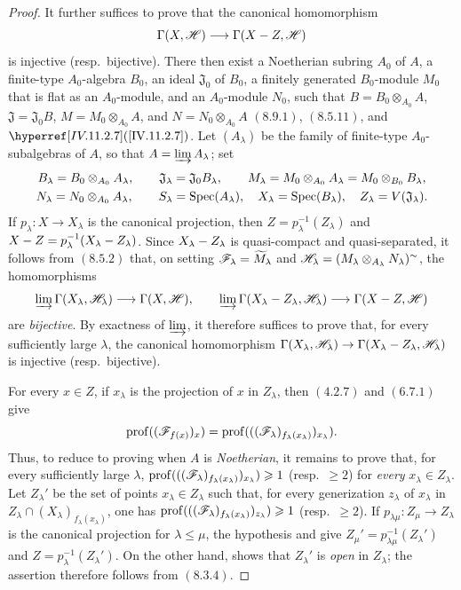 \begin{proof}
It further suffices to prove that the canonical homomorphism
\[
  \Gamma(X,\mathscr{H})\longrightarrow\Gamma(X-Z,\mathscr{H})
\]
is injective (resp.\ bijective). There then exist a Noetherian subring $A_0$ of $A$, a finite-type $A_0$-algebra $B_0$, an ideal $\mathfrak{J}_0$ of $B_0$, a finitely generated $B_0$-module $M_0$ that is flat as an $A_0$-module, and an $A_0$-module $N_0$, such that
$B=B_0\otimes_{A_0}A$, $\mathfrak{J}=\mathfrak{J}_0B$, $M=M_0\otimes_{A_0}A$, and $N=N_0\otimes_{A_0}A$ $(8.9.1)$, $(8.5.11)$, and $\sref{IV.11.2.7}$. Let $(A_\lambda)$ be the family of finite-type $A_0$-subalgebras of $A$, so that $A=\varinjlim A_\lambda$; set
\[
\begin{gathered}
  B_\lambda=B_0\otimes_{A_0}A_\lambda,\qquad
  \mathfrak{J}_\lambda=\mathfrak{J}_0B_\lambda,\qquad
  M_\lambda=M_0\otimes_{A_0}A_\lambda=M_0\otimes_{B_0}B_\lambda,\\
  N_\lambda=N_0\otimes_{A_0}A_\lambda,\qquad
  S_\lambda=\operatorname{Spec}(A_\lambda),\quad X_\lambda=\operatorname{Spec}(B_\lambda),\quad
  Z_\lambda=V(\mathfrak{J}_\lambda).
\end{gathered}
\]
If $p_\lambda:X\to X_\lambda$ is the canonical projection, then $Z=p_\lambda^{-1}(Z_\lambda)$ and $X- Z=p_\lambda^{-1}(X_\lambda- Z_\lambda)$. Since $X_\lambda- Z_\lambda$ is quasi-compact and quasi-separated, it follows from $(8.5.2)$ that, on setting $\mathscr{F}_\lambda=\widetilde{M}_\lambda$ and $\mathscr{H}_\lambda=(M_\lambda\otimes_{A_\lambda}N_\lambda)^\sim$, the homomorphisms
\[
  \varinjlim\Gamma(X_\lambda,\mathscr{H}_\lambda)\longrightarrow\Gamma(X,\mathscr{H}),
  \qquad
  \varinjlim\Gamma(X_\lambda-Z_\lambda,\mathscr{H}_\lambda)\longrightarrow\Gamma(X-Z,\mathscr{H})
\]
are \emph{bijective}. By exactness of $\varinjlim$, it therefore suffices to prove that, for every sufficiently large $\lambda$, the canonical homomorphism $\Gamma(X_\lambda,\mathscr{H}_\lambda)\to\Gamma(X_\lambda-Z_\lambda,\mathscr{H}_\lambda)$ is injective (resp.\ bijective).

For every $x\in Z$, if $x_\lambda$ is the projection of $x$ in $Z_\lambda$, then $(4.2.7)$ and $(6.7.1)$ give
\[
  \operatorname{prof}((\mathscr{F}_{f(x)})_x)
  =\operatorname{prof}(((\mathscr{F}_\lambda)_{f_\lambda(x_\lambda)})_{x_\lambda}).
\]
Thus, to reduce to proving  when $A$ is \emph{Noetherian}, it remains to prove that, for every sufficiently large $\lambda$, $\operatorname{prof}(((\mathscr{F}_\lambda)_{f_\lambda(x_\lambda)})_{x_\lambda})\geqslant1$ (resp.\ $\geqslant2$) for \emph{every} $x_\lambda\in Z_\lambda$. Let $Z_\lambda'$ be the set of points $x_\lambda\in Z_\lambda$ such that, for every generization $z_\lambda$ of $x_\lambda$ in $Z_\lambda\cap(X_\lambda)_{f_\lambda(x_\lambda)}$, one has $\operatorname{prof}(((\mathscr{F}_\lambda)_{f_\lambda(x_\lambda)})_{z_\lambda})\geqslant1$ (resp.\ $\geqslant2$). If $p_{\lambda\mu}:Z_\mu\to Z_\lambda$ is the canonical projection for $\lambda\leqslant\mu$, the hypothesis and  give $Z_\mu'=p_{\lambda\mu}^{-1}(Z_\lambda')$ and $Z=p_\lambda^{-1}(Z_\lambda')$. On the other hand,  shows that $Z_\lambda'$ is \emph{open} in $Z_\lambda$; the assertion therefore follows from $(8.3.4)$.


\end{proof}

